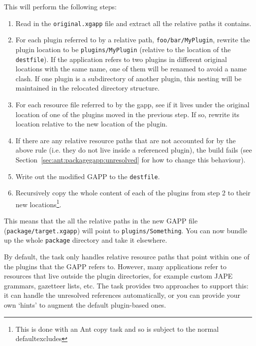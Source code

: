 This will perform the following steps:
\begin{enumerate}
\item Read in the \texttt{original.xgapp} file and extract all the relative
  paths it contains.
\item For each plugin referred to by a relative path,
  \texttt{foo/bar/MyPlugin}, rewrite the plugin location to be
  \texttt{plugins/MyPlugin} (relative to the location of the
  \texttt{destfile}).  If the application refers to two plugins in different
  original locations with the same name, one of them will be renamed to avoid a
  name clash.  If one plugin is a subdirectory of another plugin, this nesting
  will be maintained in the relocated directory structure.
\item For each resource file referred to by the gapp, see if it lives under the
  original location of one of the plugins moved in the previous step.  If so,
  rewrite its location relative to the new location of the plugin.
\item If there are any relative resource paths that are not accounted for by
  the above rule (i.e. they do not live inside a referenced plugin), the build
  fails (see Section~\ref{sec:ant:packagegapp:unresolved} for how to change
  this behaviour).
\item Write out the modified GAPP to the \texttt{destfile}.
\item Recursively copy the whole content of each of the plugins from step 2 to
  their new locations\footnote{This is done with an Ant copy task and so is
  subject to the normal defaultexcludes}.
\end{enumerate}

This means that the all the relative paths in the new GAPP file
(\texttt{package/target.xgapp}) will point to \texttt{plugins/Something}.  You
can now bundle up the whole \texttt{package} directory and take it elsewhere.


By default, the task only handles relative resource paths that point within one
of the plugins that the GAPP refers to.  However, many applications refer to
resources that live outside the plugin directories, for example custom JAPE
grammars, gazetteer lists, etc.  The task provides two approaches to support
this: it can handle the unresolved references automatically, or you can provide
your own `hints' to augment the default plugin-based ones.


